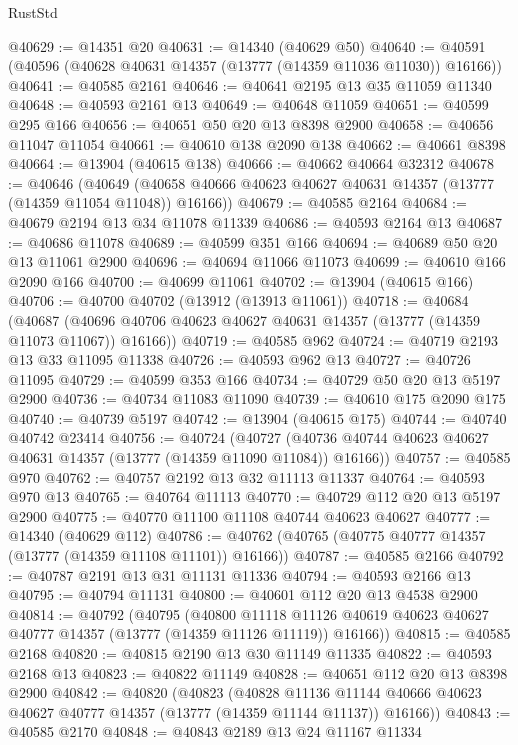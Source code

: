 \begin{lexlean}{RustStd}
\begin{coremodule}
@40629 := @14351 @20
@40631 := @14340 (@40629 @50)
@40640 := @40591 (@40596 (@40628 @40631 @14357 (@13777 (@14359 @11036 @11030)) @16166))
@40641 := @40585 @2161
@40646 := @40641 @2195 @13 @35 @11059 @11340
@40648 := @40593 @2161 @13
@40649 := @40648 @11059
@40651 := @40599 @295 @166
@40656 := @40651 @50 @20 @13 @8398 @2900
@40658 := @40656 @11047 @11054
@40661 := @40610 @138 @2090 @138
@40662 := @40661 @8398
@40664 := @13904 (@40615 @138)
@40666 := @40662 @40664 @32312
@40678 := @40646
    (@40649 (@40658 @40666 @40623 @40627 @40631 @14357 (@13777 (@14359 @11054 @11048)) @16166))
@40679 := @40585 @2164
@40684 := @40679 @2194 @13 @34 @11078 @11339
@40686 := @40593 @2164 @13
@40687 := @40686 @11078
@40689 := @40599 @351 @166
@40694 := @40689 @50 @20 @13 @11061 @2900
@40696 := @40694 @11066 @11073
@40699 := @40610 @166 @2090 @166
@40700 := @40699 @11061
@40702 := @13904 (@40615 @166)
@40706 := @40700 @40702 (@13912 (@13913 @11061))
@40718 := @40684
    (@40687 (@40696 @40706 @40623 @40627 @40631 @14357 (@13777 (@14359 @11073 @11067)) @16166))
@40719 := @40585 @962
@40724 := @40719 @2193 @13 @33 @11095 @11338
@40726 := @40593 @962 @13
@40727 := @40726 @11095
@40729 := @40599 @353 @166
@40734 := @40729 @50 @20 @13 @5197 @2900
@40736 := @40734 @11083 @11090
@40739 := @40610 @175 @2090 @175
@40740 := @40739 @5197
@40742 := @13904 (@40615 @175)
@40744 := @40740 @40742 @23414
@40756 := @40724
    (@40727 (@40736 @40744 @40623 @40627 @40631 @14357 (@13777 (@14359 @11090 @11084)) @16166))
@40757 := @40585 @970
@40762 := @40757 @2192 @13 @32 @11113 @11337
@40764 := @40593 @970 @13
@40765 := @40764 @11113
@40770 := @40729 @112 @20 @13 @5197 @2900
@40775 := @40770 @11100 @11108 @40744 @40623 @40627
@40777 := @14340 (@40629 @112)
@40786 := @40762 (@40765 (@40775 @40777 @14357 (@13777 (@14359 @11108 @11101)) @16166))
@40787 := @40585 @2166
@40792 := @40787 @2191 @13 @31 @11131 @11336
@40794 := @40593 @2166 @13
@40795 := @40794 @11131
@40800 := @40601 @112 @20 @13 @4538 @2900
@40814 := @40792
    (@40795
      (@40800
        @11118
        @11126
        @40619
        @40623
        @40627
        @40777
        @14357
        (@13777 (@14359 @11126 @11119))
        @16166))
@40815 := @40585 @2168
@40820 := @40815 @2190 @13 @30 @11149 @11335
@40822 := @40593 @2168 @13
@40823 := @40822 @11149
@40828 := @40651 @112 @20 @13 @8398 @2900
@40842 := @40820
    (@40823
      (@40828
        @11136
        @11144
        @40666
        @40623
        @40627
        @40777
        @14357
        (@13777 (@14359 @11144 @11137))
        @16166))
@40843 := @40585 @2170
@40848 := @40843 @2189 @13 @24 @11167 @11334

\end{coremodule}
\end{lexlean}
